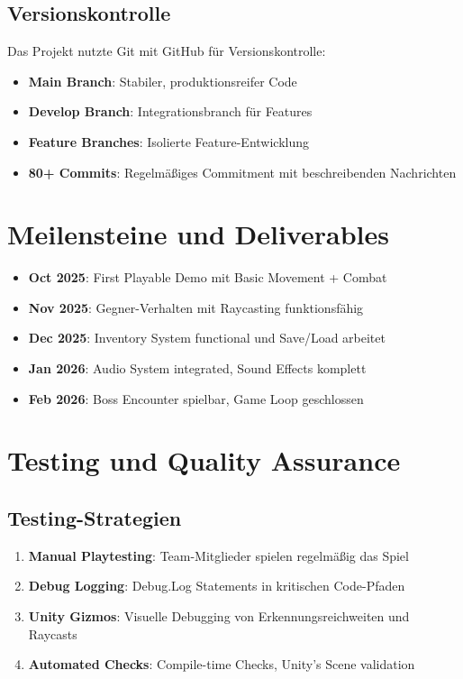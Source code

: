 \documentclass[
  a4paper,
  11pt,
  ngerman,
  parskip=half,
  bibliography=totoc,
  listof=totoc
]{scrreprt}
\begin{document}
\subsection{Versionskontrolle}

Das Projekt nutzte Git \cite{nostalelike_github_repo} mit GitHub für Versionskontrolle:

\begin{itemize}
    \item \textbf{Main Branch}: Stabiler, produktionsreifer Code
    \item \textbf{Develop Branch}: Integrationsbranch für Features
    \item \textbf{Feature Branches}: Isolierte Feature-Entwicklung
    \item \textbf{80+ Commits}: Regelmäßiges Commitment mit beschreibenden Nachrichten
\end{itemize}

\section{Meilensteine und Deliverables}

\begin{itemize}
    \item \textbf{Oct 2025}: First Playable Demo mit Basic Movement + Combat
    \item \textbf{Nov 2025}: Gegner-Verhalten mit Raycasting funktionsfähig
    \item \textbf{Dec 2025}: Inventory System functional und Save/Load arbeitet
    \item \textbf{Jan 2026}: Audio System integrated, Sound Effects komplett
    \item \textbf{Feb 2026}: Boss Encounter spielbar, Game Loop geschlossen
\end{itemize}

\section{Testing und Quality Assurance}

\subsection{Testing-Strategien}

\begin{enumerate}
    \item \textbf{Manual Playtesting}: Team-Mitglieder spielen regelmäßig das Spiel
    \item \textbf{Debug Logging}: Debug.Log Statements in kritischen Code-Pfaden
    \item \textbf{Unity Gizmos}: Visuelle Debugging von Erkennungsreichweiten und Raycasts
    \item \textbf{Automated Checks}: Compile-time Checks, Unity's Scene validation
\end{enumerate}
\end{document}
